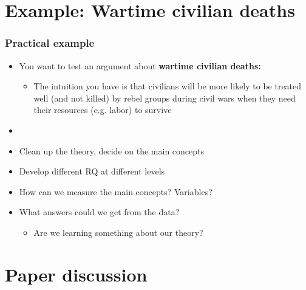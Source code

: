\documentclass[aspectratio=43]{beamer}
\begin{document}
\section{Example: Wartime civilian deaths}

\begin{frame}
\frametitle{Practical example}
\centering

\begin{itemize}
  \item You want to test an argument about \textbf{wartime civilian deaths:}
  \begin{itemize}
    \item The intuition you have is that civilians will be more likely to be treated well (and not killed) by rebel groups during civil wars when they need their resources (e.g. labor) to survive
  \end{itemize}
  \item[]
  \item Clean up the theory, decide on the main concepts
  \item Develop different RQ at different levels
  \item How can we measure the main concepts? Variables?
  \item What answers could we get from the data?
    \begin{itemize}
      \item Are we learning something about our theory?
    \end{itemize}
\end{itemize}

\end{frame}

\section{Paper discussion}


\end{document}
